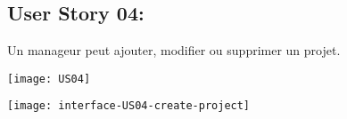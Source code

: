 \newpage{}
\subsection{User Story 04:}
Un manageur peut ajouter, modifier ou supprimer un projet.

  \begin{center}
        \texttt{[image: US04]}
  \end{center}


\newpage{}
  \begin{center}
        \texttt{[image: interface-US04-create-project]}
  \end{center}